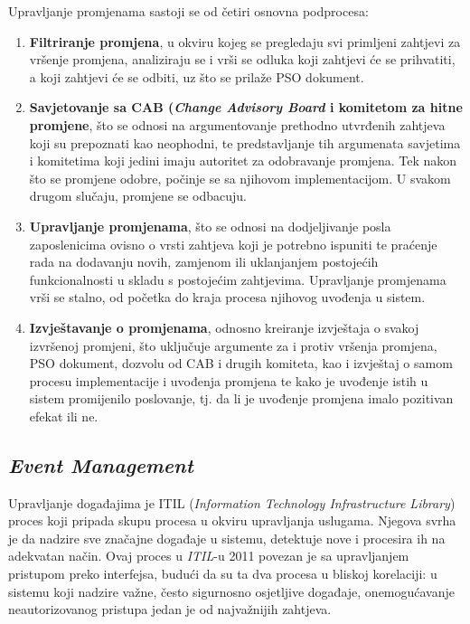 \documentclass[12pt,a4paper]{article}
\begin{document}
Upravljanje promjenama sastoji se od četiri osnovna podprocesa:

\begin{enumerate}
\item \textbf{Filtriranje promjena}, u okviru kojeg se pregledaju svi primljeni zahtjevi za vršenje promjena, analiziraju se i vrši se odluka koji zahtjevi će se prihvatiti, a koji zahtjevi će se odbiti, uz što se prilaže PSO dokument.

\item \textbf{Savjetovanje sa CAB (\textit{Change Advisory Board} i komitetom za hitne promjene}, što se odnosi na argumentovanje prethodno utvrđenih zahtjeva koji su prepoznati kao neophodni, te predstavljanje tih argumenata savjetima i komitetima koji jedini imaju autoritet za odobravanje promjena. Tek nakon što se promjene odobre, počinje se sa njihovom implementacijom. U svakom drugom slučaju, promjene se odbacuju.

\item \textbf{Upravljanje promjenama}, što se odnosi na dodjeljivanje posla zaposlenicima ovisno o vrsti zahtjeva koji je potrebno ispuniti te praćenje rada na dodavanju novih, zamjenom ili uklanjanjem postojećih funkcionalnosti u skladu s postojećim zahtjevima. Upravljanje promjenama vrši se stalno, od početka do kraja procesa njihovog uvođenja u sistem.

\item \textbf{Izvještavanje o promjenama}, odnosno kreiranje izvještaja o svakoj izvršenoj promjeni, što uključuje argumente za i protiv vršenja promjena, PSO dokument, dozvolu od CAB i drugih komiteta, kao i izvještaj o samom procesu implementacije i uvođenja promjena te kako je uvođenje istih u sistem promijenilo poslovanje, tj. da li je uvođenje promjena imalo pozitivan efekat ili ne.

\end{enumerate}

\subsection{\textit{Event Management}}

\quad Upravljanje događajima je ITIL (\textit{Information Technology Infrastructure Library}) proces koji pripada skupu procesa u okviru upravljanja uslugama. Njegova svrha je da nadzire sve značajne događaje u sistemu, detektuje nove i procesira ih na adekvatan način. Ovaj proces u \textit{ITIL}-u 2011 povezan je sa upravljanjem pristupom preko interfejsa, budući da su ta dva procesa u bliskoj korelaciji: u sistemu koji nadzire važne, često sigurnosno osjetljive događaje, onemogućavanje neautorizovanog pristupa jedan je od najvažnijih zahtjeva. \\
\end{document}
